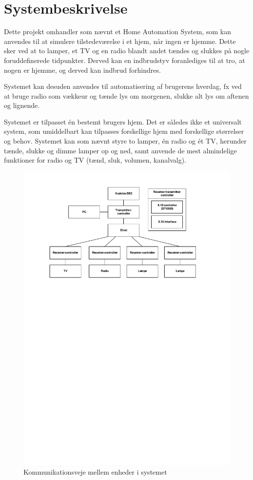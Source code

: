 \chapter{Systembeskrivelse}
Dette projekt omhandler som nævnt et Home Automation System, som kan anvendes til at simulere tilstedeværelse i et hjem, når ingen er hjemme. 
Dette sker ved at to lamper, et TV og en radio blandt andet tændes og slukkes på nogle foruddefinerede tidpunkter. 
Derved kan en indbrudstyv foranlediges til at tro, at nogen er hjemme, og derved kan indbrud forhindres. 

Systemet kan desuden anvendes til automatisering af brugerens hverdag, fx ved at bruge radio som vækkeur og tænde lys om morgenen, slukke alt lys om aftenen og lignende. 

Systemet er tilpasset én bestemt brugers hjem. 
Det er således ikke et universalt system, som umiddelbart kan tilpasses forskellige hjem med forskellige størrelser og behov. 
Systemet kan som nævnt styre to lamper, én radio og ét TV, herunder tænde, slukke og dimme lamper op og ned, samt anvende de mest almindelige funktioner for radio og TV (tænd, sluk, volumen, kanalvalg). 

\begin{figure} [h]
\centering
\includegraphics[scale=0.9,trim=50 535 80 40, clip=true] {../Projektdokumentation/Projektformulering/kommunikation_diagram.pdf}
\caption{Kommunikationsveje mellem enheder i systemet}
\end{figure}

